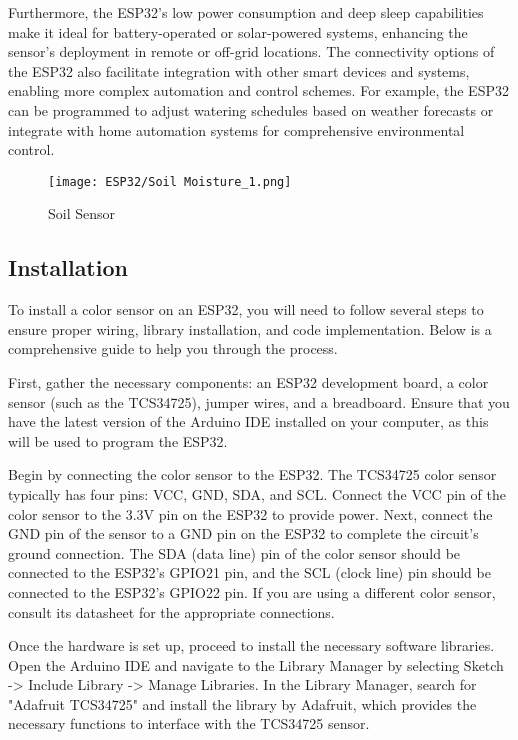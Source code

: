 Furthermore, the ESP32’s low power consumption and deep sleep capabilities make it ideal for battery-operated or solar-powered systems, enhancing the sensor’s deployment in remote or off-grid locations. The connectivity options of the ESP32 also facilitate integration with other smart devices and systems, enabling more complex automation and control schemes. For example, the ESP32 can be programmed to adjust watering schedules based on weather forecasts or integrate with home automation systems for comprehensive environmental control.

\begin{figure}  
	\begin{center}
		\texttt{[image: ESP32/Soil Moisture\_1.png]}
		\caption{Soil Sensor } 
		\label{fig:Python 3.10.}
	\end{center}
\end{figure}	

\subsection{Installation}
To install a color sensor on an ESP32, you will need to follow several steps to ensure proper wiring, library installation, and code implementation. Below is a comprehensive guide to help you through the process.

First, gather the necessary components: an ESP32 development board, a color sensor (such as the TCS34725), jumper wires, and a breadboard. Ensure that you have the latest version of the Arduino IDE installed on your computer, as this will be used to program the ESP32.

Begin by connecting the color sensor to the ESP32. The TCS34725 color sensor typically has four pins: VCC, GND, SDA, and SCL. Connect the VCC pin of the color sensor to the 3.3V pin on the ESP32 to provide power. Next, connect the GND pin of the sensor to a GND pin on the ESP32 to complete the circuit’s ground connection. The SDA (data line) pin of the color sensor should be connected to the ESP32’s GPIO21 pin, and the SCL (clock line) pin should be connected to the ESP32’s GPIO22 pin. If you are using a different color sensor, consult its datasheet for the appropriate connections.

Once the hardware is set up, proceed to install the necessary software libraries. Open the Arduino IDE and navigate to the Library Manager by selecting Sketch -> Include Library -> Manage Libraries. In the Library Manager, search for "Adafruit TCS34725" and install the library by Adafruit, which provides the necessary functions to interface with the TCS34725 sensor.

